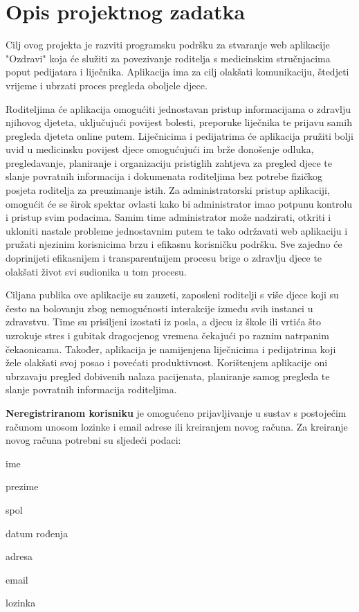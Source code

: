 \chapter{Opis projektnog zadatka}
		Cilj ovog projekta je razviti programsku podršku za stvaranje web aplikacije "Ozdravi" koja će služiti za povezivanje roditelja s medicinskim stručnjacima poput pedijatara i liječnika. Aplikacija ima za cilj olakšati komunikaciju, štedjeti vrijeme i ubrzati proces pregleda oboljele djece.
		
		Roditeljima će aplikacija omogućiti jednostavan pristup informacijama o zdravlju njihovog djeteta, uključujući povijest bolesti, preporuke liječnika te prijavu samih pregleda djeteta online putem. Liječnicima i pedijatrima će aplikacija pružiti bolji uvid u medicinsku povijest djece omogućujući im brže donošenje odluka, pregledavanje, planiranje i organizaciju pristiglih zahtjeva za pregled djece te slanje povratnih informacija i dokumenata roditeljima bez potrebe fizičkog posjeta roditelja za preuzimanje istih. Za administratorski pristup aplikaciji, omogućit će se širok spektar ovlasti kako bi administrator imao potpunu kontrolu i pristup svim podacima. Samim time administrator može nadzirati, otkriti i ukloniti nastale probleme jednostavnim putem te tako održavati web aplikaciju i pružati njezinim korisnicima brzu i efikasnu korisničku podršku. Sve zajedno će doprinijeti efikasnijem i transparentnijem procesu brige o zdravlju djece te olakšati život svi sudionika u tom procesu.
		
		Ciljana publika ove aplikacije su zauzeti, zaposleni roditelji s više djece koji su često na bolovanju zbog nemogućnosti interakcije između svih instanci u zdravstvu. Time su prisiljeni izostati iz posla, a djecu iz škole ili vrtića što uzrokuje stres i gubitak dragocjenog vremena čekajući po raznim natrpanim čekaonicama. Također, aplikacija je namijenjena liječnicima i pedijatrima koji žele olakšati svoj posao i povećati produktivnost. Korištenjem aplikacije oni ubrzavaju pregled dobivenih nalaza pacijenata, planiranje samog pregleda te slanje povratnih informacija roditeljima.
		
		\textbf{Neregistriranom korisniku} je omogućeno prijavljivanje u sustav s postojećim računom unosom lozinke i email adrese ili kreiranjem novog računa. Za kreiranje novog računa potrebni su sljedeći podaci: 
				\begin{packed_item}
					\item ime
					\item prezime
					\item spol
					\item datum rođenja
					\item adresa
					\item email
					\item lozinka
				\end{packed_item}
		
